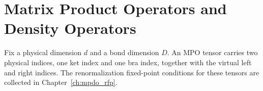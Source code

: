 
\chapter{Matrix Product Operators and Density Operators}\label{ch:mpdo}

Fix a physical dimension $d$ and a bond dimension $D$.
An MPO tensor carries two physical indices, one ket index and one bra index,
together with the virtual left and right indices.
The renormalization fixed-point conditions for these tensors are collected in
Chapter~\ref{ch:mpdo_rfp}.



